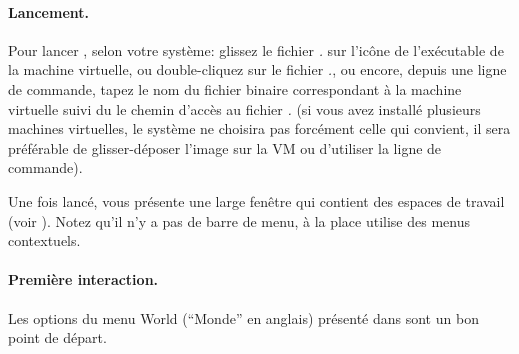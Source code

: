 \documentclass[a4paper,10pt,twoside]{book}
\begin{document}

\paragraph{Lancement.} Pour lancer \sq, selon votre système: glissez
le fichier \emph{.} sur l'icône de l'exécutable de la
machine virtuelle, ou double-cliquez sur le fichier
\emph{.}, ou encore, depuis une ligne de commande,
tapez le nom du fichier binaire correspondant \`a la machine virtuelle
suivi du le chemin d'accès au fichier \emph{.} (si vous
avez installé plusieurs machines virtuelles, le système ne choisira
pas forcément celle qui convient, il sera préférable de
glisser-déposer l'image sur la VM ou d'utiliser la ligne de commande).

Une fois lancé, \sq vous présente une large fenêtre qui contient des espaces de travail (voir ). Notez qu'il n'y a pas de barre de menu, à la place \sq utilise des menus contextuels. 


\paragraph{Première interaction.}

Les options du menu World (``Monde'' en anglais) pr\'esent\'e dans
 sont un bon point de d\'epart.

\end{document}
